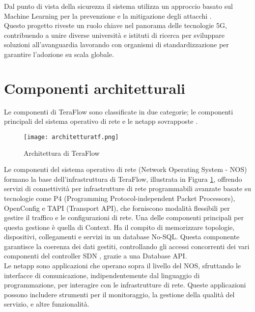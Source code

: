 Dal punto di vista della sicurezza il sistema utilizza un approccio basato sul Machine Learning per la prevenzione e la mitigazione degli attacchi \cite{D41}.
\\Questo progetto riveste un ruolo chiave nel panorama delle tecnologie 5G, contribuendo a unire diverse università e istituti di ricerca per sviluppare soluzioni all'avanguardia
lavorando con organismi di standardizzazione per garantire l'adozione su scala globale.
\section{Componenti architetturali}
Le componenti di TeraFlow sono classificate in due categorie; le componenti principali del sistema operativo di rete e le netapp sovrapposte \cite{Component}. 
\begin{figure}[h]
    \centering
   \texttt{[image: architetturatf.png]}
    \caption{Architettura di TeraFlow \cite{archtfs}}
    \label{fig:tfs}
\end{figure}
Le componenti del sistema operativo di rete (Network Operating System - NOS) formano la base dell'infrastruttura di TeraFlow, illustrata in Figura \ref{fig:tfs}, offrendo servizi di connettività per infrastrutture di rete programmabili avanzate \cite{Component} %
basate su tecnologie come P4 (Programming Protocol-independent Packet Processors), OpenConfig e TAPI (Transport API), che forniscono modalità flessibili per gestire il traffico e le configurazioni di rete.
Una delle componenti principali per questa gestione è quella di Context. Ha il compito di memorizzare topologie, dispositivi, 
collegamenti e servizi in un database No-SQL\cite{D31}. 
Questa componente garantisce la coerenza dei dati gestiti, controllando gli accessi concorrenti dei vari componenti del controller SDN \cite{arttfs},
grazie a una Database API.
\\Le netapp sono applicazioni che operano sopra il livello del NOS, sfruttando le interfacce di comunicazione, indipendentemente dal linguaggio di programmazione, per interagire con le infrastrutture di rete.
Queste applicazioni possono includere strumenti per il monitoraggio, la gestione della qualità del servizio, e altre funzionalità.
